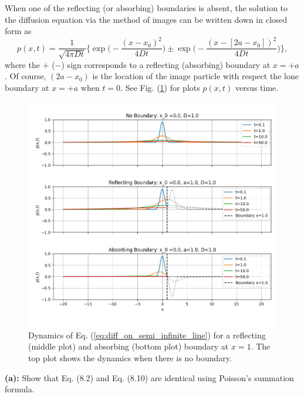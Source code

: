 When one of the reflecting (or absorbing) boundaries is absent, the solution to the diffusion equation via the method of images can be written down in closed form as
\begin{equation}
p(x,t) = \frac{1}{\sqrt{4 \pi D t} } \bigg\{ \exp \bigg( - \frac{(x-x_0)^2}{4Dt}\bigg) \pm \exp \bigg( - \frac{(x-[2a-x_0])^2}{4Dt}\bigg) \bigg\}, \label{eq:diff_on_semi_infinite_line}
\end{equation}
where the $+$ ($-$) sign corresponds to a reflecting (absorbing) boundary at $x=+a$. Of course, $(2a-x_0)$ is the location of the image particle with respect the lone boundary at $x=+a$ when $t=0$. See Fig. (\ref{fig:8p2}) for plots $p(x,t)$ versus time.

\begin{figure}[hb!]
\centering
\includegraphics[width=14cm]{reflecting_absorbing_dynamics.png}
    \caption{Dynamics of Eq. (\ref{eq:diff_on_semi_infinite_line}) for a reflecting (middle plot) and absorbing (bottom plot) boundary at $x=1$. The top plot shows the dynamics when there is no boundary.}
    \label{fig:8p2}
\end{figure}

\textbf{(a):} Show that Eq. (8.2) and Eq. (8.10) are identical using Poisson's summation formula.


